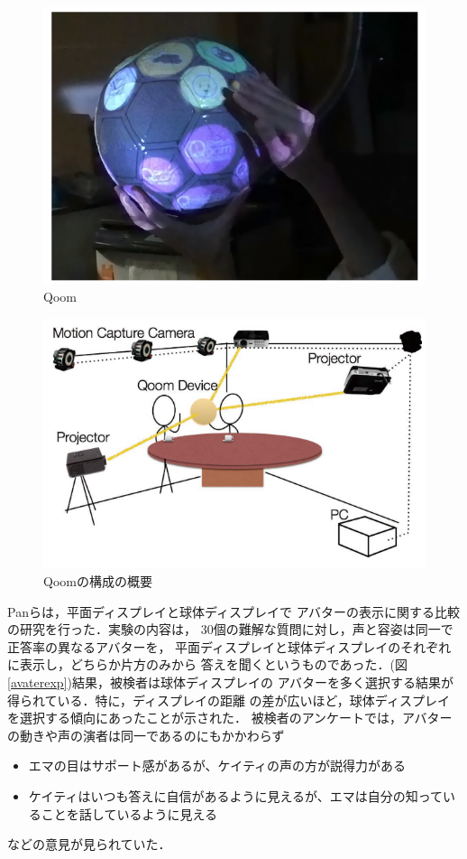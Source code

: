 \begin{figure}[tp]
  \centering
  \includegraphics[scale=0.9]{fig/qoom.png}
  \caption{Qoom\cite{25}}
\end{figure}

\begin{figure}[tp]
  \centering
  \includegraphics[scale=1.0]{fig/qoomsys.png}
  \caption{Qoomの構成の概要\cite{25}}
\end{figure}

Panら\cite{26}は，平面ディスプレイと球体ディスプレイで
アバターの表示に関する比較の研究を行った．実験の内容は，
30個の難解な質問に対し，声と容姿は同一で正答率の異なるアバターを，
平面ディスプレイと球体ディスプレイのそれぞれに表示し，どちらか片方のみから
答えを聞くというものであった．(図\ref{avaterexp})結果，被検者は球体ディスプレイの
アバターを多く選択する結果が得られている．特に，ディスプレイの距離
の差が広いほど，球体ディスプレイを選択する傾向にあったことが示された．
被検者のアンケートでは，アバターの動きや声の演者は同一であるのにもかかわらず
\begin{itemize}
  \item エマの目はサポート感があるが、ケイティの声の方が説得力がある
  \item ケイティはいつも答えに自信があるように見えるが、エマは自分の知っていることを話しているように見える
\end{itemize}
などの意見が見られていた．

